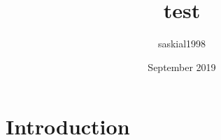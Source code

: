 \documentclass{article}
\title{test}
\author{saskial1998 }
\date{September 2019}
\begin{document}
\maketitle

\section{Introduction}
\end{document}
